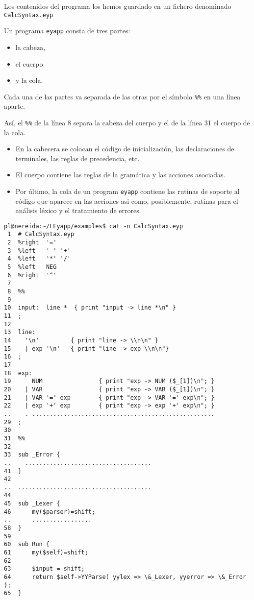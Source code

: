 Los contenidos del programa  los hemos guardado
en un fichero denominado \verb|CalcSyntax.eyp|


Un programa \verb|eyapp| consta de tres partes: 

\begin{itemize}
\item
la cabeza, 
\item
el cuerpo
\item
y la cola. 
\end{itemize}

Cada una de las partes va separada de las otras por el
símbolo \verb|%%| en una línea aparte. 

Así, el \verb|%%| de la línea 8
separa la cabeza del cuerpo y el de la línea 31 el cuerpo de la cola. 

\begin{itemize}
\item
En la cabecera se colocan el
código de inicialización, las declaraciones de terminales, las reglas
de precedencia, etc.  

\item
El cuerpo contiene las reglas de la gramática y
las acciones asociadas. 

\item
Por último, la cola de un program \verb|eyapp|
contiene las rutinas de soporte al código que aparece en las acciones 
asi como, posiblemente, rutinas para el análisis léxico 
y el tratamiento de errores.
\end{itemize}

\begin{verbatim}
pl@nereida:~/LEyapp/examples$ cat -n CalcSyntax.eyp
 1  # CalcSyntax.eyp
 2  %right  '='
 3  %left   '-' '+'
 4  %left   '*' '/'
 5  %left   NEG
 6  %right  '^'
 7
 8  %%
 9
10  input:  line *  { print "input -> line *\n" }
11  ;
12
13  line:
14    '\n'         { print "line -> \\n\n" }
15    | exp '\n'   { print "line -> exp \\n\n"}
16  ;
17
18  exp:
19      NUM                { print "exp -> NUM ($_[1])\n"; }
20    | VAR                { print "exp -> VAR ($_[1])\n"; }
21    | VAR '=' exp        { print "exp -> VAR '=' exp\n"; }
22    | exp '+' exp        { print "exp -> exp '+' exp\n"; }
..    . ....................................................
29  ;
30
31  %%
32
33  sub _Error {
..    ....................................
41  }
42
..  ......................................
44
45  sub _Lexer {
46      my($parser)=shift;
..      .................
58  }
59
60  sub Run {
61      my($self)=shift;
62
63      $input = shift;
64      return $self->YYParse( yylex => \&_Lexer, yyerror => \&_Error );
65  }
\end{verbatim}

